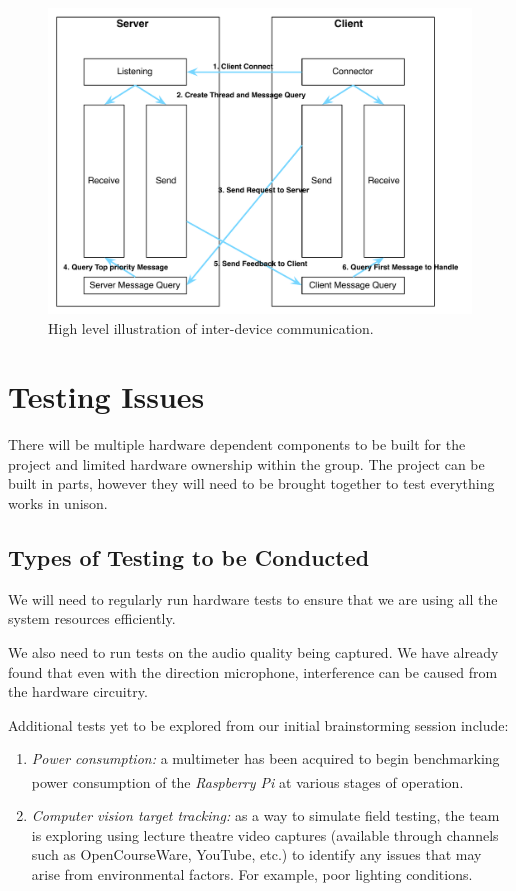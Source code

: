 \documentclass[11pt,a4paper,titlepage]{report}
\newcommand{\rpi}{\textit{Raspberry Pi\textsuperscript{\textregistered}}}
\begin{document}
\begin{figure}
\centering
\includegraphics[width=1.0\textwidth]{graphs/comm.pdf}
\caption{High level illustration of inter-device communication.}
\label{fig:comm}
\end{figure}


\section{Testing Issues}

There will be multiple hardware dependent components to be built for the project and limited hardware ownership within the group. The project can be built in parts, however they will need to be brought together to test everything works in unison.

\subsection{Types of Testing to be Conducted}

We will need to regularly run hardware tests to ensure that we are using all the system resources efficiently.

We also need to run tests on the audio quality being captured. We have already found that even with the direction microphone, interference can be caused from the hardware circuitry. 

Additional tests yet to be explored from our initial brainstorming session include:

\begin{enumerate}
  \item \textit{Power consumption:} a multimeter has been acquired to begin benchmarking power consumption of the \rpi\xspace at various stages of operation.
  \item \textit{Computer vision target tracking:} as a way to simulate field testing, the team is exploring using lecture theatre video captures (available through channels such as OpenCourseWare, YouTube, etc.) to identify any issues that may arise from environmental factors. For example, poor lighting conditions.

\end{enumerate}
\end{document}
